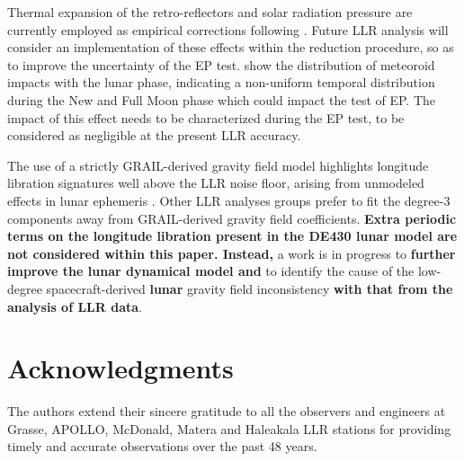 \documentclass[fleqn,usenatbib,referee]{mnras}
\begin{document}
Thermal expansion of the retro-reflectors and solar radiation pressure are currently employed as empirical corrections following \cite{Vokrouhlicky1997,Williams2009}. Future LLR analysis will consider an implementation of these effects within the reduction procedure, so as to improve the uncertainty of the EP test. \cite{Oberst2012} show the distribution of meteoroid impacts with the lunar phase, indicating a non-uniform temporal distribution during the New and Full Moon phase which could impact the test of EP. The impact of this effect needs to be characterized during the EP test, to be considered as negligible at the present LLR accuracy.


The use of a strictly GRAIL-derived gravity field model \cite[]{Konopliv2013} highlights longitude libration signatures well above the LLR noise floor, arising from unmodeled effects in lunar ephemeris \cite[]{Viswanathan2017b}. Other LLR analyses groups \cite[]{Folkner2009,Folkner2014,Pavlov2016} prefer to fit the degree-3 components away from GRAIL-derived gravity field coefficients. \textbf{Extra periodic terms on the longitude libration present in the DE430 lunar model are not considered within this paper. Instead, }a work is in progress to \textbf{further improve the lunar dynamical model and }to identify the cause of the low-degree spacecraft-derived \textbf{lunar }gravity field inconsistency\textbf{ with that from the analysis of LLR data}.

\section*{Acknowledgments}
The authors extend their sincere gratitude to all the observers and engineers at Grasse, APOLLO, McDonald, Matera and Haleakala LLR stations for providing timely and accurate observations over the past 48 years.
\end{document}
